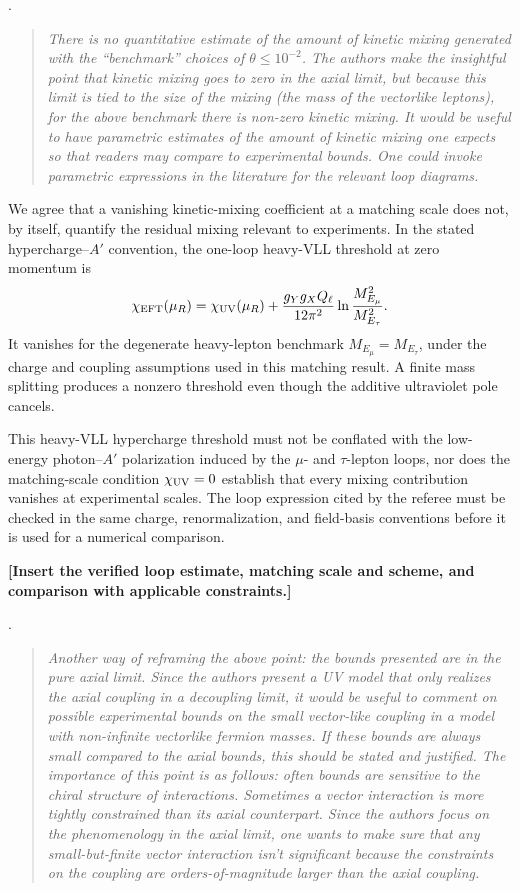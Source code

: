 \documentclass[12pt,a4paper]{article}
\begin{document}
\medskip
{}.
\begin{quote}\itshape
There is no quantitative estimate of the amount of kinetic mixing generated with the ``benchmark'' choices of \(\theta\leq10^{-2}\). The authors make the insightful point that kinetic mixing goes to zero in the axial limit, but because this limit is tied to the size of the mixing (the mass of the vectorlike leptons), for the above benchmark there is non-zero kinetic mixing. It would be useful to have parametric estimates of the amount of kinetic mixing one expects so that readers may compare to experimental bounds. One could invoke parametric expressions in the literature for the relevant loop diagrams.
\end{quote}


We agree that a vanishing kinetic-mixing coefficient at a matching scale does not, by itself, quantify the residual mixing relevant to experiments. In the stated hypercharge--\(A'\) convention, the one-loop heavy-VLL threshold at zero momentum is
\[
\chi_{\rm EFT}(\mu_R)=\chi_{\rm UV}(\mu_R)
+\frac{g_Yg_XQ_\ell}{12\pi^2}
\ln\frac{M_{E_\mu}^2}{M_{E_\tau}^2}.
\]
It vanishes for the degenerate heavy-lepton benchmark \(M_{E_\mu}=M_{E_\tau}\), under the charge and coupling assumptions used in this matching result. A finite mass splitting produces a nonzero threshold even though the additive ultraviolet pole cancels.

This heavy-VLL hypercharge threshold must not be conflated with the low-energy photon--\(A'\) polarization induced by the \(\mu\)- and \(\tau\)-lepton loops, nor does the matching-scale condition \(\chi_{\rm UV}=0\) establish that every mixing contribution vanishes at experimental scales. The loop expression cited by the referee must be checked in the same charge, renormalization, and field-basis conventions before it is used for a numerical comparison.

\textbf{[Insert the verified loop estimate, matching scale and scheme, and comparison with applicable constraints.]}

\medskip
{}.
\begin{quote}\itshape
Another way of reframing the above point: the bounds presented are in the pure axial limit. Since the authors present a UV model that only realizes the axial coupling in a decoupling limit, it would be useful to comment on possible experimental bounds on the small vector-like coupling in a model with non-infinite vectorlike fermion masses. If these bounds are always small compared to the axial bounds, this should be stated and justified. The importance of this point is as follows: often bounds are sensitive to the chiral structure of interactions. Sometimes a vector interaction is more tightly constrained than its axial counterpart. Since the authors focus on the phenomenology in the axial limit, one wants to make sure that any small-but-finite vector interaction isn't significant because the constraints on the coupling are orders-of-magnitude larger than the axial coupling.
\end{quote}
\end{document}

